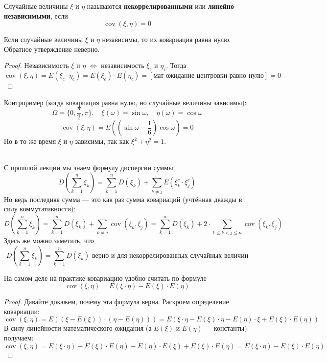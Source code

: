 \documentclass[11pt]{article}
\DeclareMathOperator{\Cov}{cov}
\begin{document}
\begin{definition}
    Случайные величины $\xi$ и $\eta$ называются \textbf{некоррелированными} или \textbf{линейно независимыми}, если 
    \[\Cov(\xi, \eta) = 0\]
\end{definition}

\begin{theorem}
    Если случайные величины $\xi$ и $\eta$ независимы, то их ковариация равна нулю. Обратное утверждение неверно.
\end{theorem}

\begin{proof}
    Независимость $\xi$ и $\eta$ $\iff$ независимость $\xi_c$ и $\eta_c$. Тогда
    \[\Cov(\xi, \eta) = E(\xi_c \cdot \eta_c) = E(\xi_c) \cdot E(\eta_c) = [\text{мат ожидание центровки равно нулю}] = 0\]  
\end{proof}

\begin{example}
    Контрпример (когда ковариация равна нулю, но случайные величины зависимы):
    \[\Omega = \{0, \frac{\pi}{2}, \pi\}, \quad \xi(\omega) = \sin \omega, \quad \eta(\omega) = \cos \omega\]
    \[\Cov(\xi, \eta) = E\left(\left(\sin \omega - \frac{1}{6}\right)\cos \omega\right) = 0\]
    Но в то же время $\xi$ и $\eta$ зависимы, так как $\xi^2 + \eta^2 = 1$.
\end{example} \leavevmode
\\
С прошлой лекции мы знаем формулу дисперсии суммы:
\[D\left(\sum_{k = 1}^{n} \xi_k\right) = \sum_{k = 1}^{n} D(\xi_k) + \sum_{k \neq j} E(\xi_k^c \cdot \xi_j^c)\]
Но ведь последняя сумма --- это как раз сумма ковариаций (учтённая дважды в силу коммутативности):
\[D\left(\sum_{k = 1}^{n} \xi_k\right) = \sum_{k = 1}^{n} D(\xi_k) + \sum_{k \neq j} \Cov(\xi_k, \xi_j) = \sum_{k = 1}^{n} D(\xi_k) + 2 \cdot \sum_{1 \leq k < j \leq n} \Cov(\xi_k, \xi_j)\]
Здесь же можно заметить, что 
\[D\left(\sum_{k = 1}^{n} \xi_k\right) = \sum_{k = 1}^{n} D(\xi_k) \text{ верно и для некоррелированных случайных величин}\]

\begin{lemma}
    На самом деле на практике ковариацию удобно считать по формуле
    \[\Cov(\xi, \eta) = E(\xi \cdot \eta) - E(\xi) \cdot E(\eta)\]
\end{lemma}

\begin{proof}
    Давайте докажем, почему эта формула верна. Раскроем определение ковариации:
    \[\Cov(\xi, \eta) = E((\xi - E(\xi)) \cdot (\eta - E(\eta))) = E(\xi \cdot \eta - E(\xi) \cdot \eta - E(\eta) \cdot \xi + E(\xi) \cdot E(\eta))\]
    В силу линейности математического ожидания (а $E(\xi)$ и $E(\eta)$ --- константы) получаем:
    \[\Cov(\xi, \eta) = E(\xi \cdot \eta) - E(\xi) \cdot E(\eta) - E(\eta) \cdot E(\xi) + E(\xi) \cdot E(\eta) = E(\xi \cdot \eta) - E(\xi) \cdot E(\eta)\]
\end{proof}
\end{document}
